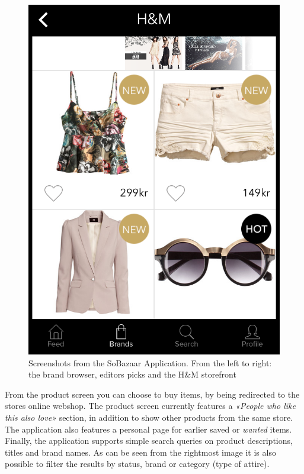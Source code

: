 \begin{figure}[H]
\begin{minipage}{.3\linewidth}
      \includegraphics[height=1.5\linewidth]{image/SoBazaarStore.png}
  \end{minipage}
  \caption[SoBazaar storefront screenshots - version 0.5.1]{Screenshots from the SoBazaar Application. From the left to right: the brand browser, editors picks and the H\&M storefront}
  \label{figure:SoBazaarfeed}
\end{figure}

From the product screen you can choose to buy items, by being redirected to the
stores online webshop. The product screen currently features a \emph{«People
who like this also love»} section, in addition to show other products from the
same store. The application also features a personal page for earlier saved or
\emph{wanted} items. Finally, the application supports simple search queries
on product descriptions, titles and brand names. As can be seen from the
rightmost image it is also possible to filter the results by status, brand or
category (type of attire).

